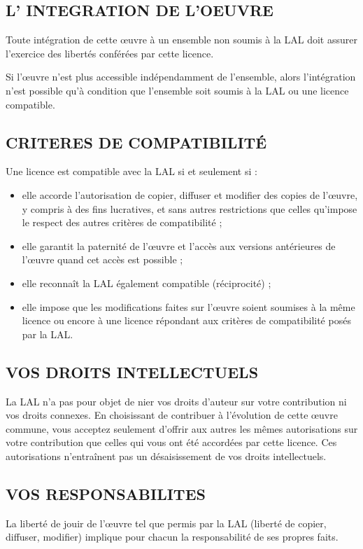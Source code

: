 \subsection{L' INTEGRATION DE L'OEUVRE}
Toute int\'egration de cette \oe uvre \`a un ensemble non soumis \`a la LAL doit assurer l'exercice des libert\'es conf\'er\'ees par cette licence.

Si l'\oe uvre n'est plus accessible ind\'ependamment de l'ensemble, alors l'int\'egration n'est possible qu'\`a condition que l'ensemble soit soumis \`a la LAL ou une licence compatible.

\subsection{CRITERES DE COMPATIBILIT\'E}
Une licence est compatible avec la LAL si et seulement si :
\begin{itemize}
\item elle accorde l'autorisation de copier, diffuser et modifier des copies de l'\oe uvre, y compris \`a des fins lucratives, et sans autres restrictions que celles qu'impose le respect des autres crit\`eres de compatibilit\'e ;
\item elle garantit la paternit\'e de l'\oe uvre et l'acc\`es aux versions ant\'erieures de l'\oe uvre quand cet acc\`es est possible ;
\item elle reconna\^it la LAL \'egalement compatible (r\'eciprocit\'e) ;
\item elle impose que les modifications faites sur l'\oe uvre soient soumises \`a la m\^eme licence ou encore \`a une licence r\'epondant aux crit\`eres de compatibilit\'e pos\'es par la LAL.
\end{itemize}

\subsection{VOS DROITS INTELLECTUELS}
La LAL n'a pas pour objet de nier vos droits d'auteur sur votre contribution ni vos droits connexes. En choisissant de contribuer \`a l'\'evolution de cette \oe uvre commune, vous acceptez seulement d'offrir aux autres les m\^emes autorisations sur votre contribution que celles qui vous ont \'et\'e accord\'ees par cette licence. Ces autorisations n'entra\^inent pas un d\'esaisissement de vos droits intellectuels.

\subsection{VOS RESPONSABILITES}
La libert\'e de jouir de l'\oe uvre tel que permis par la LAL (libert\'e de copier, diffuser, modifier) implique pour chacun la responsabilit\'e de ses propres faits.

